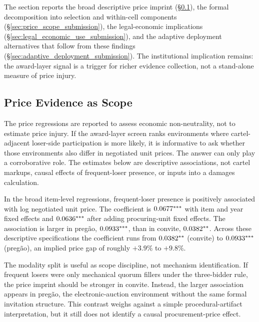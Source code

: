 The section reports the broad descriptive price imprint
(\S\ref{sec:price_imprint_submission}), the formal decomposition
into selection and within-cell components
(\S\ref{sec:price_scope_submission}), the legal-economic
implications (\S\ref{sec:legal_economic_use_submission}), and
the adaptive deployment alternatives that follow from these
findings (\S\ref{sec:adaptive_deployment_submission}). The
institutional implication remains: the award-layer signal is a
trigger for richer evidence collection, not a stand-alone measure
of price injury.

\subsection{Price Evidence as Scope}
\label{sec:price_imprint_submission}

The price regressions are reported to assess economic
non-neutrality, not to estimate price injury. If the award-layer
screen ranks environments where cartel-adjacent loser-side
participation is more likely, it is informative to ask whether
those environments also differ in negotiated unit prices. The
answer can only play a corroborative role. The estimates below
are descriptive associations, not cartel markups, causal effects
of frequent-loser presence, or inputs into a damages calculation.

In the broad item-level regressions, frequent-loser presence is
positively associated with log negotiated unit price. The
coefficient is $0.0677^{***}$ with item and year fixed
effects and $0.0636^{***}$ after adding procuring-unit
fixed effects. The association is larger in pregão,
$0.0933^{***}$, than in convite, $0.0382^{**}$.
Across these descriptive specifications the coefficient runs from
$0.0382^{**}$ (convite) to $0.0933^{***}$
(pregão), an implied price gap of roughly $+3.9\%$ to $+9.8\%$.

The modality split is useful as scope discipline, not mechanism
identification. If frequent losers were only mechanical quorum
fillers under the three-bidder rule, the price imprint should be
stronger in convite. Instead, the larger association appears in
pregão, the electronic-auction environment without the same formal
invitation structure. This contrast weighs against a simple
procedural-artifact interpretation, but it still does not identify
a causal procurement-price effect.

